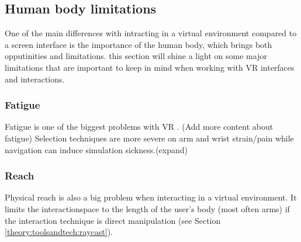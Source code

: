 \subsection{Human body limitations}
\label{theory:bodyLimits}
One of the main differences with intracting in a virtual environment compared to a screen interface is the importance of the human body, which brings both opputinities and limitations. this section will shine a light on some major limitations that are important to keep in mind when working with VR interfaces and interactions.
\subsubsection{Fatigue}
Fatigue is one of the biggest problems with VR \cite{limitations:burdea2003virtual}. (Add more content about fatigue)
Selection techniques are more severe on arm and wrist strain/pain while navigation can induce simulation sickness.(expand)
\subsubsection{Reach}
Physical reach is also a big problem when interacting in a virtual environment. It limits the interactionspace to the length of the user's body (most often arms) if the interaction technique is direct manipulation (see Section \ref{theory:toolsandtech:raycast}).
